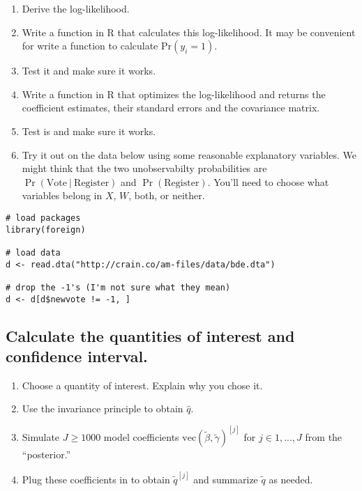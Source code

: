\documentclass[12pt]{article}
\begin{document}
\begin{enumerate}
\item Derive the log-likelihood.
\item Write a function in R that calculates this log-likelihood. It may be convenient for write a function to calculate $\text{Pr}(y_i = 1)$.
\item Test it and make sure it works.
\item Write a function in R that optimizes the log-likelihood and returns the coefficient estimates, their standard errors and the covariance matrix.
\item Test is and make sure it works.
\item Try it out on the data below using some reasonable explanatory variables. We might think that the two unobservabilty probabilities are $\Pr(\text{Vote}~|~\text{Register})$ and $\Pr(\text{Register})$. You'll need to choose what variables belong in $X$, $W$, both, or neither.
\end{enumerate}

\begin{verbatim}
# load packages
library(foreign)

# load data
d <- read.dta("http://crain.co/am-files/data/bde.dta")

# drop the -1's (I'm not sure what they mean)
d <- d[d$newvote != -1, ]
\end{verbatim}

\subsection*{Calculate the quantities of interest and confidence interval.}

\begin{enumerate}
\item Choose a quantity of interest. Explain why you chose it.
\item Use the invariance principle to obtain $\hat{q}$.
\item Simulate $J \geq 1000$ model coefficients $\text{vec}(\tilde{\beta}, \tilde{\gamma})^{[j]}$ for $j \in 1,..., J$ from the ``posterior.''
\item Plug these coefficients in to obtain $\tilde{q}^{[j]}$ and summarize $\tilde{q}$ as needed.
\end{enumerate}
\end{document}
